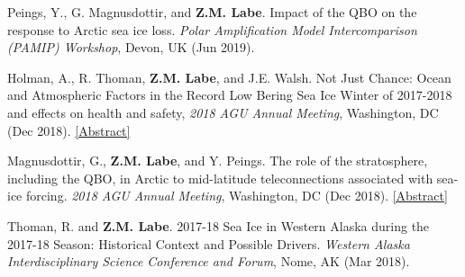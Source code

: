 \documentclass[margin,line,palatino,courier,10pt]{res}
\begin{document}
\begin{resume}
\begin{etaremune}[leftmargin=0in,topsep=0in,parsep=0in]
\item Peings, Y., G. Magnusdottir, and \textbf{Z.M. Labe}. Impact of the QBO on the response to Arctic sea ice loss. \textit{Polar Amplification Model Intercomparison (PAMIP) Workshop}, Devon, UK (Jun 2019).
\item Holman, A., R. Thoman, \textbf{Z.M. Labe}, and J.E. Walsh. Not Just Chance: Ocean and Atmospheric Factors in the Record Low Bering Sea Ice Winter of 2017-2018 and effects on health and safety, \textit{2018 AGU Annual Meeting}, Washington, DC (Dec 2018). \href{https://agu.confex.com/agu/fm18/meetingapp.cgi/Paper/451295}{[Abstract]}
\item Magnusdottir, G., \textbf{Z.M. Labe}, and Y. Peings. The role of the stratosphere, including the QBO, in Arctic to mid-latitude teleconnections associated with sea-ice forcing. \textit{2018 AGU Annual Meeting}, Washington, DC (Dec 2018). \href{https://agu.confex.com/agu/fm18/meetingapp.cgi/Paper/399117}{[Abstract]}
\item Thoman, R. and \textbf{Z.M. Labe}. 2017-18 Sea Ice in Western Alaska during the 2017-18 Season: Historical Context and Possible Drivers. \textit{Western Alaska Interdisciplinary Science Conference and Forum}, Nome, AK (Mar 2018). 

\end{etaremune}

\vspace{-0.1in}
\noindent\textcolor{MidnightBlue}{\makebox[\linewidth][r]{\rule{\textwidth}{5pt}}}
\vspace{-0.3in}


\end{resume}
\end{document}
